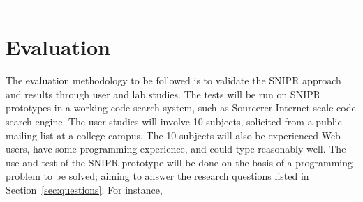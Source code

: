 \fancybreak{\pfbreakdisplay}

\section{Evaluation}
\label{sec:evaluate}

The evaluation methodology to be followed is to validate the \uppercase{SnipR} approach and results through user and lab studies. The tests will be run on \uppercase{SnipR} prototypes in a working code search system, such as Sourcerer\cite{Bajracharya:2006vn} Internet-scale code search engine. The user studies will involve 10 subjects, solicited from a public mailing list at a college campus. The 10 subjects will also be experienced Web users, have some programming experience, and could type reasonably well. The use and test of the \uppercase{SnipR} prototype will be done on the basis of a programming problem to be solved; aiming to answer the research questions listed in Section~\ref{sec:questions}. For instance,


